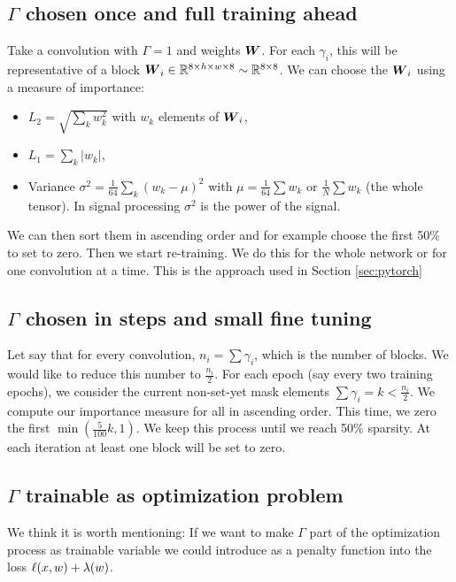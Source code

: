 \documentclass[conference]{IEEEtran}
\begin{document}
\subsection{$\Gamma$ chosen once and full training ahead}
\label{sec:one-mask}
Take a convolution with $\Gamma = 1$ and weights ${\boldsymbol W}$. For each
$\gamma_i$, this will be representative of a block ${\boldsymbol W}_i \in \mathbb{R}^{8
  \times h \times w \times 8} \sim \mathbb{R}^{8\times 8}$. We can choose the
${\boldsymbol W}_i$ using a measure of importance:
\begin{itemize}
  \item $L_2 = \sqrt{\sum_k w_k^2}$ with $w_k$ elements of ${\boldsymbol W}_i$,
  \item $L_1 = \sum_k |w_k|$,
  \item Variance $\sigma^2 = \frac{1}{64}\sum_k (w_k -\mu)^2$ with
    $\mu = \frac{1}{64}\sum w_k $ or $\frac{1}{N}\sum w_k$ (the whole
    tensor). In signal processing $\sigma^2$ is the power of the
    signal.
\end{itemize}
We can then sort them in ascending order and for example choose the
first 50\% to set to zero. Then we start re-training. We do this for the
whole network or for one convolution at a time. This is the approach
used in Section \ref{sec:pytorch}

\subsection{$\Gamma$ chosen in steps  and small fine tuning}

Let say that for every convolution, $n_i =\sum \gamma_i$, which is the
number of blocks. We would like to reduce this number to
$\frac{n_i}{2}$. For each epoch (say every two training epochs), we
consider the current non-set-yet mask elements $\sum \gamma_i = k <
\frac{n_i}{2}$. We compute our importance measure for all in ascending
order. This time, we zero the first $\min(\frac{5}{100}k, 1)$. We
keep this process until we reach 50\% sparsity. At each iteration at
least one block will be set to zero.

\subsection{$\Gamma$ trainable as optimization problem}

We think it is worth mentioning: If we want to make $\Gamma$ part of
the optimization process as trainable variable we could introduce as a
penalty function into the loss ${\bf \ell}(x,w) + \lambda(w)$.
\end{document}
